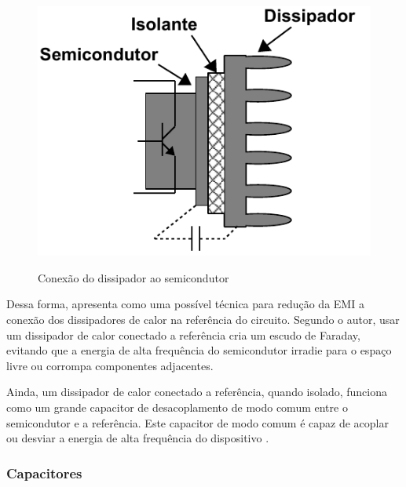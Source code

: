             \begin{figure}[H]
            	\centering
            	\caption{Conexão do dissipador ao semicondutor}
            	\includegraphics[scale=.8]{pdf/outros/dissipador.pdf}
            	\label{fig:dissipador_semi}
            \end{figure}
            
            Dessa forma,  apresenta como uma possível técnica para redução da EMI a conexão dos dissipadores de calor na referência do circuito. Segundo o autor, usar um dissipador de calor conectado a referência cria um escudo de Faraday, evitando que a energia de alta frequência do semicondutor irradie para o espaço livre ou corrompa componentes adjacentes. 
            
            Ainda, um dissipador de calor conectado a referência, quando isolado, funciona como um grande capacitor de desacoplamento de modo comum entre o semicondutor e a referência. Este capacitor de modo comum é capaz de acoplar ou desviar a energia de alta frequência do dispositivo \cite{ref:EMC_livro_PrintedCircuit}.
            
            \subsubsection{Capacitores} \label{cap:fund_emc_conv_mitig_cap}
            

